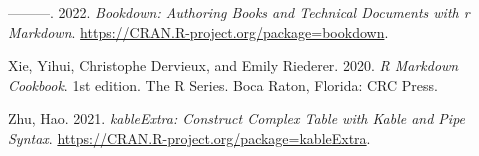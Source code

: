 \begin{CSLReferences}{1}{0}
\leavevmode{}%
---------. 2022. \emph{Bookdown: Authoring Books and Technical Documents with r Markdown}. \url{https://CRAN.R-project.org/package=bookdown}.

\leavevmode{}%
Xie, Yihui, Christophe Dervieux, and Emily Riederer. 2020. \emph{R {Markdown Cookbook}}. 1st edition. The {R Series}. {Boca Raton, Florida}: {CRC Press}.

\leavevmode{}%
Zhu, Hao. 2021. \emph{kableExtra: Construct Complex Table with Kable and Pipe Syntax}. \url{https://CRAN.R-project.org/package=kableExtra}.

\end{CSLReferences}



\address{%
David M. Kaplan\\
MARBEC\\%
Univ Montepllier, CNRS, Ifremer, IRD\\ Sète, France\\
Institute de Recherche pour le Developpement (IRD)\\%
UMR MARBEC\\ av. Jean Monnet\\ CS 30171\\ 34203 Sète cedex, France\\
%
\url{https://www.davidmkaplan.fr}\\%
\textit{ORCiD: \href{https://orcid.org/0000-0001-6087-359X}{0000-0001-6087-359X}}\\%
\href{mailto:david.kaplan@ird.fr}{\nolinkurl{david.kaplan@ird.fr}}%
}
